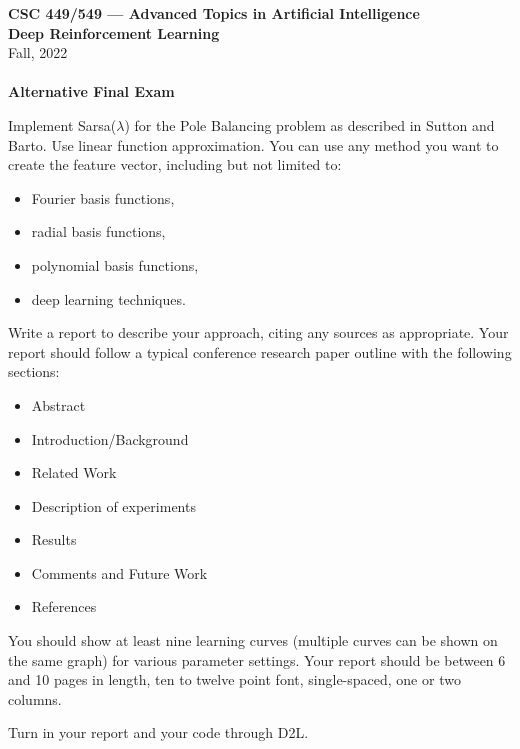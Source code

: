 \documentclass[12pt]{article}
\begin{document}
\begin{center}
  {
  \bf\large
  CSC  449/549 --- Advanced Topics in Artificial Intelligence\\
  Deep Reinforcement Learning
  }\\
  Fall, 2022\\
\ \\
    {\bf
      Alternative Final Exam
    }
  
\end{center}
Implement Sarsa($\lambda$) for the Pole Balancing problem as described
in Sutton and Barto. Use linear function approximation. You can use any method you want to create the feature vector, including but not limited to:
\begin{itemize}
\item Fourier
basis
functions,
\item radial basis functions,
\item polynomial basis functions,
\item deep learning techniques.
\end{itemize}

Write a report to describe your approach, citing any sources as appropriate. 
Your report should follow a typical conference research paper outline with the following sections:
\begin{itemize}
  \item Abstract
  \item Introduction/Background
  \item Related Work
  \item Description of experiments
  \item Results
  \item Comments and Future Work
  \item References
\end{itemize}
You should show at least nine learning curves (multiple curves can be shown on the same graph) for various parameter settings. Your report should be between 6 and 10 pages in length, ten to twelve point font, single-spaced, one or two columns.





Turn in your report and your code through D2L.
\end{document}
